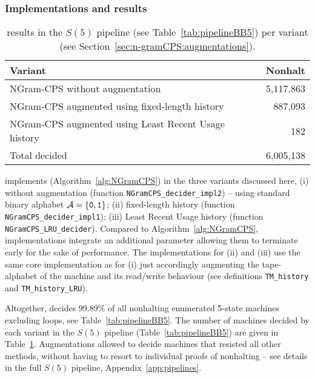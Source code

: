 \subsubsection{Implementations and results}\label{sec:n-gramCPS:results}
\begin{table}[h!]
    \centering
    \begin{tabular}{|l|r|}
        \hline
        Variant                                              & Nonhalt   \\  \hline
        NGram-CPS without augmentation                       & 5,117,863 \\
        NGram-CPS augmented using fixed-length history       & 887,093   \\
        NGram-CPS augmented using Least Recent Usage history & 182       \\ \hline
        Total decided                                        & 6,005,138 \\
        \hline
    \end{tabular}
    \caption{\ngramcps results in the $S(5)$ pipeline (see Table~\ref{tab:pipelineBB5}) per variant (see Section~\ref{sec:n-gramCPS:augmentations}).}\label{tab:ngramcps:results}
\end{table}

\CoqBB implements \ngramcps (Algorithm~\ref{alg:NGramCPS}) in the three variants discussed here, (i) without augmentation (function \texttt{NGramCPS\_decider\_impl2}) -- \ie using standard binary alphabet $\mathcal{A}=\{\texttt{0},\texttt{1}\}$; (ii) fixed-length history (function \texttt{NGramCPS\_decider\_impl1}); (iii) Least Recent Usage history (function \texttt{NGramCPS\_LRU\_decider}). Compared to Algorithm~\ref{alg:NGramCPS}, \CoqBB implementations integrate an additional parameter allowing them to terminate early for the sake of performance. The implementations for (ii) and (iii) use the same core implementation as for (i) just accordingly augmenting the tape-alphabet of the machine and its read/write behaviour (see definitions \texttt{TM\_history} and \texttt{TM\_history\_LRU}).

Altogether, \ngramcps decides 99.89\% of all nonhalting enumerated 5-state machines excluding loops, see Table~\ref{tab:pipelineBB5}. The number of machines decided by each \ngramcps variant in the $S(5)$ pipeline (Table~\ref{tab:pipelineBB5}) are given in Table~\ref{tab:ngramcps:results}. Augmentations allowed to decide machines that resisted all other methods, without having to resort to individual proofs of nonhalting -- see details in the full $S(5)$ pipeline, Appendix~\ref{app:pipelines}.

